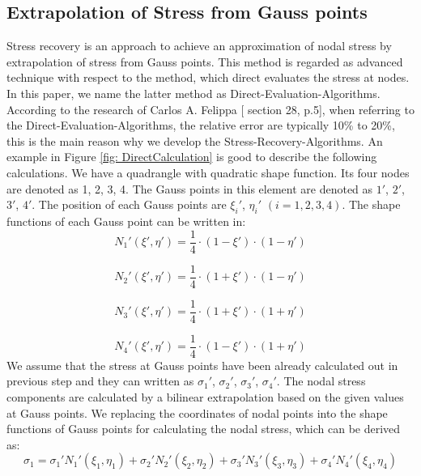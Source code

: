 \subsection{Extrapolation of Stress from Gauss points}
Stress recovery is an approach to achieve an approximation of nodal stress by extrapolation of stress from Gauss points. This method is regarded as advanced technique with respect to the method, which direct evaluates the stress at nodes. In this paper, we name the latter method as Direct-Evaluation-Algorithms. According to the research of Carlos A. Felippa [\cite{Felippa} section 28, p.5],  when referring to the Direct-Evaluation-Algorithms, the relative error are typically 10\% to 20\%, this is the main reason why we develop the Stress-Recovery-Algorithms. An example in Figure \ref{fig: DirectCalculation} is good to describe the following calculations. We have a quadrangle with quadratic shape function. Its four nodes are denoted as 1, 2, 3, 4. The Gauss points in this element are denoted as $1'$, $2'$, $3'$, $4'$. The position of each Gauss points are ${\xi_i}'$, ${\eta_i}'$ $\left(i = 1, 2, 3, 4\right)$. The shape functions of each Gauss point can be written in: 
\begin{equation}
{N_1}' \left(\xi',\eta'\right) = \frac{1}{4}\cdot\left(1 - {\xi}'\right) \cdot \left(1 - {\eta}' \right) 
\end{equation}  

\begin{equation}
{N_2}'\left(\xi',\eta'\right) = \frac{1}{4}\cdot\left(1 + {\xi}'\right) \cdot \left(1 - {\eta}' \right) 
\end{equation}  

\begin{equation}
{N_3}'\left(\xi',\eta'\right) = \frac{1}{4}\cdot\left(1 + {\xi}'\right) \cdot \left(1 + {\eta}' \right) 
\end{equation}  

\begin{equation}
{N_4}' \left(\xi',\eta'\right) = \frac{1}{4}\cdot\left(1 - {\xi}'\right) \cdot \left(1 + {\eta}' \right) 
\end{equation}
We assume that the stress at Gauss points have been already calculated out in previous step and they can written as ${\sigma_1}'$, ${\sigma_2}'$, ${\sigma_3}'$, ${\sigma_4}'$. The nodal stress components are calculated by a bilinear extrapolation based on the given values at Gauss points. We replacing the coordinates of nodal points into the shape functions of Gauss points for calculating the nodal stress, which can be derived as:   
\begin{equation}
\sigma_1 = {\sigma_1}' {N_1}'\left(\xi_1, \eta_1\right) + {\sigma_2}' {N_2}'\left(\xi_2, \eta_2\right) + {\sigma_3}' {N_3}'\left(\xi_3, \eta_3\right) + {\sigma_4}' {N_4}' \left(\xi_4, \eta_4\right)
\end{equation}


